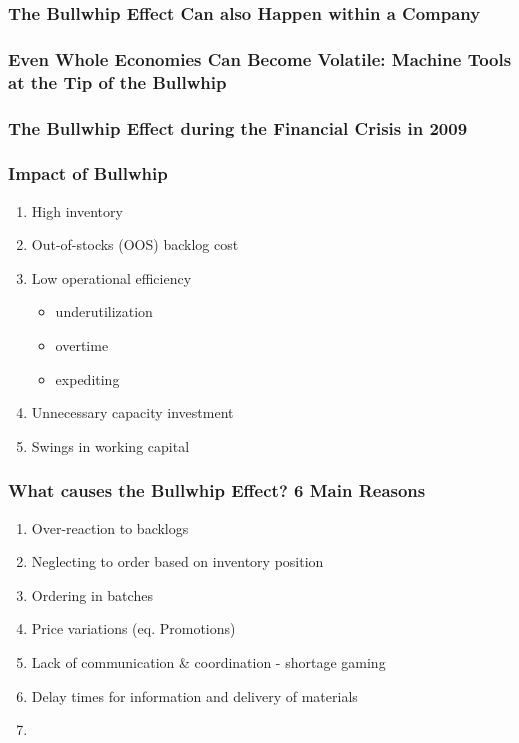 \subsubsection{The Bullwhip Effect Can also Happen within a Company}
\subsubsection{Even Whole Economies Can Become Volatile: Machine Tools at the Tip of the Bullwhip}
\subsubsection{The Bullwhip Effect during the Financial Crisis in 2009}
\subsubsection{Impact of Bullwhip}
\begin{enumerate}
\item High inventory
\item Out-of-stocks (OOS) backlog cost
\item Low operational efficiency
\begin{itemize}
	\item underutilization
	\item overtime
	\item expediting
	\end{itemize}
\item Unnecessary capacity investment
\item Swings in working capital
\end{enumerate}
\subsubsection{What causes the Bullwhip Effect? 6 Main Reasons}
\begin{enumerate}
	\item Over-reaction to backlogs
	\item Neglecting to order based on inventory position
	\item Ordering in batches 
	\item Price variations (eq. Promotions)
	\item Lack of communication \& coordination - shortage gaming
	\item Delay times for information and delivery of materials
\item
\end{enumerate}
